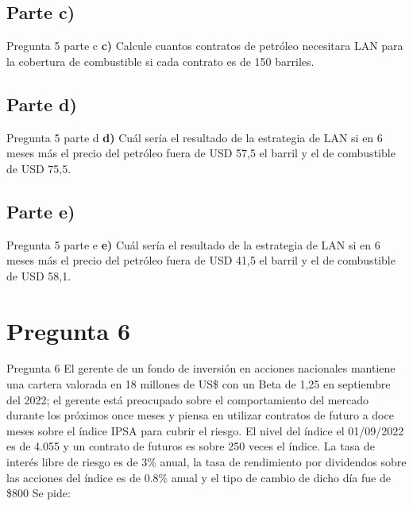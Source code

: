 \documentclass{beamer}
\begin{document}
\subsection{Parte c)}
  \begin{frame}{Pregunta 5 parte c}
    \textbf{c)} Calcule cuantos contratos de petróleo necesitara LAN para la cobertura de combustible si cada contrato es de 150 barriles.
  \end{frame}

\subsection{Parte d)}
  \begin{frame}{Pregunta 5 parte d}
    \textbf{d)}  Cuál sería el resultado de la estrategia de LAN si en 6 meses más el precio del petróleo fuera de USD 57,5 el barril y el de combustible de USD 75,5.
  \end{frame}

\subsection{Parte e)}
  \begin{frame}{Pregunta 5 parte e}
    \textbf{e)} Cuál sería el resultado de la estrategia de LAN si en 6 meses más el precio del petróleo fuera de USD 41,5 el barril y el de combustible de USD 58,1.
  \end{frame}

\section{Pregunta 6}
\begin{frame}{Pregunta 6}
  El gerente de un fondo de inversión en acciones nacionales mantiene una cartera valorada en 18 millones de US\$ con un Beta de 
1,25 en septiembre del 2022; el gerente está preocupado sobre el comportamiento del mercado durante los próximos once meses y 
piensa en utilizar contratos de futuro a doce meses sobre el índice IPSA para cubrir el riesgo. El nivel del índice el 01/09/2022 
es de 4.055 y un contrato de futuros es sobre 250 veces el índice. La tasa de interés libre de riesgo es de 3\% anual, la tasa de 
rendimiento por dividendos sobre las acciones del índice es de 0.8\% anual y el tipo de cambio de dicho día fue de \$800  Se pide:
\end{frame}
\end{document}
